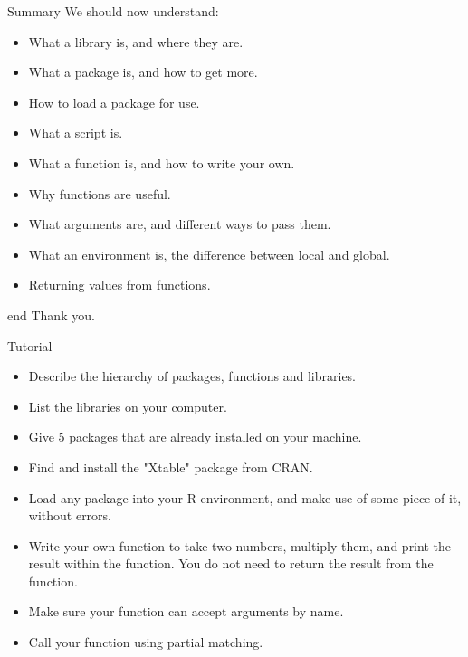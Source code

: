 \documentclass{beamer}\usepackage[]{graphicx}\usepackage[]{color}
\begin{document}
\begin{frame}[fragile]{Summary}
We should now understand:
\begin{itemize}
\item What a library is, and where they are.
\item What a package is, and how to get more.
\item How to load a package for use.
\item What a script is.
\item What a function is, and how to write your own.
\item Why functions are useful.
\item What arguments are, and different ways to pass them.
\item What an environment is, the difference between local and global.
\item Returning values from functions.
\end{itemize}
\end{frame}

\begin{frame}[fragile]{end}
Thank you.
\end{frame}

\begin{frame}[fragile]{Tutorial}



\begin{itemize}
\item Describe the hierarchy of packages, functions and libraries.
\item List the libraries on your computer.
\item Give 5 packages that are already installed on your machine.
\item Find and install the "Xtable" package from CRAN.
\item Load any package into your R environment, and make use of some piece of it, without errors.
\item Write your own function to take two numbers, multiply them, and print the result within the function. You do not need to return the result from the function.
\item Make sure your function can accept arguments by name.
\item Call your function using partial matching.
\end{itemize}
\end{frame}
\end{document}
